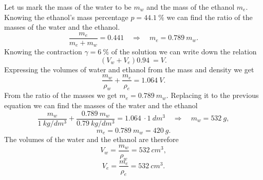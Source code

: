 \solueng
Let us mark the mass of the water to be $m_w$ and the mass of the ethanol $m_e$. Knowing the ethanol’s mass percentage $p = \SI{44,1}{\percent}$ we can find the ratio of the masses of the water and the ethanol. 
\[ \frac{m_e}{m_e+m_w}=\SI{0,441}  \quad\Rightarrow\quad m_e=\SI{0,789}{}m_w.\]
Knowing the contraction $\gamma = \SI{6}{\percent}$ of the solution we can write down the relation
\[ (V_w + V_e)\SI{0,94}{} = V.\]
Expressing the volumes of water and ethanol from the mass and density we get
\[ \frac{m_w}{\rho_w} + \frac{m_e}{\rho_e} = \SI{1,064}{}V.\]
From the ratio of the masses we get $m_e=\SI{0,789}{}m_w$. Replacing it to the previous equation we can find the masses of the water and the ethanol
\[ \frac{m_w}{\SI{1}{kg/dm^3}} + \frac{\SI{0,789}{}{m_w}}{\SI{0,79}{kg/dm^3}} = \SI{1,064}{}\cdot\SI{1}{dm^3} \quad\Rightarrow\quad
m_w = \SI{532}{g},\]
\[ m_e = \SI{0,789}{}m_w =  \SI{420}{g}.\]
The volumes of the water and the ethanol are therefore
\[ V_w = \frac{m_w}{\rho_w} = \SI{532}{cm^3},\]
\[ V_e = \frac{m_e}{\rho_e} =  \SI{532}{cm^3}.\]
\probend